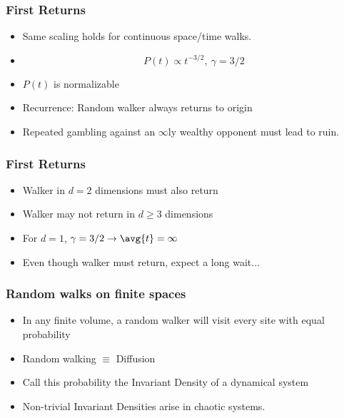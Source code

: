 \begin{frame}
  \frametitle{First Returns}

  \begin{itemize}
  \item<1-> Same scaling holds for continuous space/time walks.
  \item<2-> $$ P(t) \propto t^{-3/2},\  \gamma = 3/2 $$
  \item<3-> $P(t)$ is normalizable
  \item<4-> \alert{Recurrence:} Random walker always returns to origin 
  \item<5-> Repeated gambling against an $\infty$ly wealthy opponent
    must lead to ruin.
  \end{itemize}

\end{frame}

\begin{frame}
  \frametitle{First Returns}

  \begin{itemize}
  \item<1-> Walker in $d=2$ dimensions must also return
  \item<2-> Walker may not return in $d \ge 3$ dimensions
  \item<3-> For $d=1$, $\gamma = 3/2 \rightarrow \avg{t} = \infty$
  \item<4-> Even though walker must return, expect a long wait...
  \end{itemize}

\end{frame}

\begin{frame}
  \frametitle{Random walks on finite spaces}
  
  \begin{itemize}
  \item<1-> In any finite volume, a random walker will visit every
  site with equal probability
  \item<2-> Random walking $\equiv$ Diffusion
  \item<3-> Call this probability the Invariant Density of
    a dynamical system
  \item<4-> Non-trivial Invariant Densities arise in chaotic systems.
  \end{itemize}

\end{frame}


